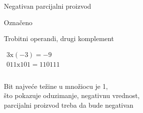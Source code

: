 
\begin{frame}[label=05-s041]{Negativan parcijalni proizvod}
\fontsize{10}{12}\selectfont

Označeno\par Trobitni operandi, drugi komplement\par
$\begin{gathered}3\mathrm{x}(-3)=-9\\011\mathrm{x}101=110111\end{gathered}$
\begin{columns}[c,onlytextwidth]
\centering
{}\centering
\end{columns}\par\vspace{4mm}
\begin{center}\alert{Bit najveće težine u množiocu je 1,\\što pokazuje oduzimanje, negativnu vrednost,\\parcijalni proizvod treba da bude negativan}\end{center}
\end{frame}
